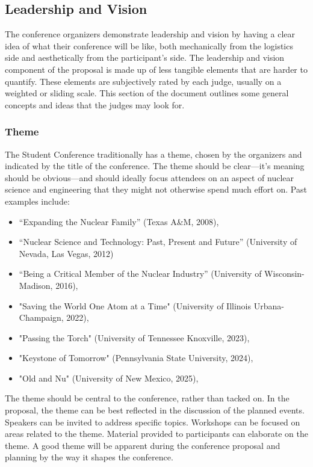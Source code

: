 \documentclass[12pt]{article}
\begin{document}
\subsection{Leadership and Vision} \label{sec:LandV2}
The conference organizers demonstrate leadership and vision by having a clear idea of
what their conference will be like, both mechanically from the logistics side and
aesthetically from the participant’s side. The leadership and vision component of the
proposal is made up of less tangible elements that are harder to quantify. These elements
are subjectively rated by each judge, usually on a weighted or sliding scale. This section
of the document outlines some general concepts and ideas that the judges may look for.


\subsubsection{Theme}
The Student Conference traditionally has a theme, chosen by the organizers and indicated
by the title of the conference. The theme should be clear---it's meaning should be obvious---and should ideally focus attendees on an aspect of nuclear science and
engineering that they might not otherwise spend much effort on. Past examples include:
\begin{itemize}
    \item “Expanding the Nuclear Family” (Texas A\&M, 2008),
    \item “Nuclear Science and Technology: Past, Present and Future” (University of Nevada, Las Vegas, 2012)
    \item “Being a Critical Member of the Nuclear Industry” (University of Wisconsin-Madison, 2016),
    \item "Saving the World One Atom at a Time" (University of Illinois Urbana-Champaign, 2022),
    \item "Passing the Torch" (University of Tennessee Knoxville, 2023),
    \item "Keystone of Tomorrow" (Pennsylvania State University, 2024),
    \item "Old and Nu" (University of New Mexico, 2025),
\end{itemize}


The theme should be central to the conference, rather than tacked on. In the proposal, the theme can be best reflected in the discussion of the planned events. Speakers can
be invited to address specific topics. Workshops can be focused on areas related to the
theme. Material provided to participants can elaborate on the theme. A good theme will be apparent during the conference proposal and planning by the way it shapes the conference.
\end{document}
